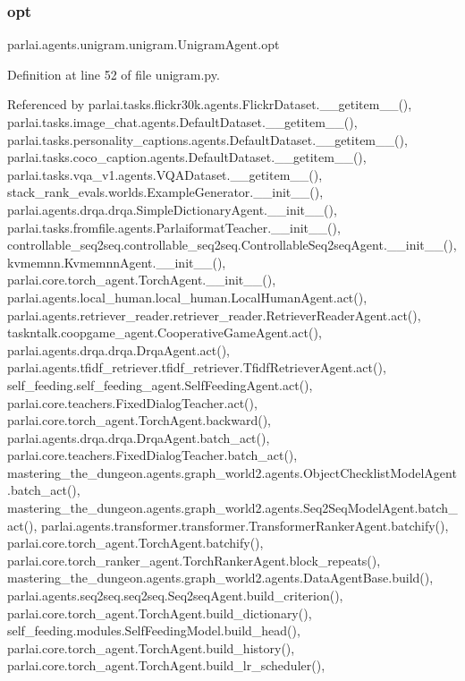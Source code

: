 \subsubsection{\texorpdfstring{opt}{opt}}
{\footnotesize\ttfamily parlai.\+agents.\+unigram.\+unigram.\+Unigram\+Agent.\+opt}



Definition at line 52 of file unigram.\+py.



Referenced by parlai.\+tasks.\+flickr30k.\+agents.\+Flickr\+Dataset.\+\_\+\+\_\+getitem\+\_\+\+\_\+(), parlai.\+tasks.\+image\+\_\+chat.\+agents.\+Default\+Dataset.\+\_\+\+\_\+getitem\+\_\+\+\_\+(), parlai.\+tasks.\+personality\+\_\+captions.\+agents.\+Default\+Dataset.\+\_\+\+\_\+getitem\+\_\+\+\_\+(), parlai.\+tasks.\+coco\+\_\+caption.\+agents.\+Default\+Dataset.\+\_\+\+\_\+getitem\+\_\+\+\_\+(), parlai.\+tasks.\+vqa\+\_\+v1.\+agents.\+V\+Q\+A\+Dataset.\+\_\+\+\_\+getitem\+\_\+\+\_\+(), stack\+\_\+rank\+\_\+evals.\+worlds.\+Example\+Generator.\+\_\+\+\_\+init\+\_\+\+\_\+(), parlai.\+agents.\+drqa.\+drqa.\+Simple\+Dictionary\+Agent.\+\_\+\+\_\+init\+\_\+\+\_\+(), parlai.\+tasks.\+fromfile.\+agents.\+Parlaiformat\+Teacher.\+\_\+\+\_\+init\+\_\+\+\_\+(), controllable\+\_\+seq2seq.\+controllable\+\_\+seq2seq.\+Controllable\+Seq2seq\+Agent.\+\_\+\+\_\+init\+\_\+\+\_\+(), kvmemnn.\+Kvmemnn\+Agent.\+\_\+\+\_\+init\+\_\+\+\_\+(), parlai.\+core.\+torch\+\_\+agent.\+Torch\+Agent.\+\_\+\+\_\+init\+\_\+\+\_\+(), parlai.\+agents.\+local\+\_\+human.\+local\+\_\+human.\+Local\+Human\+Agent.\+act(), parlai.\+agents.\+retriever\+\_\+reader.\+retriever\+\_\+reader.\+Retriever\+Reader\+Agent.\+act(), taskntalk.\+coopgame\+\_\+agent.\+Cooperative\+Game\+Agent.\+act(), parlai.\+agents.\+drqa.\+drqa.\+Drqa\+Agent.\+act(), parlai.\+agents.\+tfidf\+\_\+retriever.\+tfidf\+\_\+retriever.\+Tfidf\+Retriever\+Agent.\+act(), self\+\_\+feeding.\+self\+\_\+feeding\+\_\+agent.\+Self\+Feeding\+Agent.\+act(), parlai.\+core.\+teachers.\+Fixed\+Dialog\+Teacher.\+act(), parlai.\+core.\+torch\+\_\+agent.\+Torch\+Agent.\+backward(), parlai.\+agents.\+drqa.\+drqa.\+Drqa\+Agent.\+batch\+\_\+act(), parlai.\+core.\+teachers.\+Fixed\+Dialog\+Teacher.\+batch\+\_\+act(), mastering\+\_\+the\+\_\+dungeon.\+agents.\+graph\+\_\+world2.\+agents.\+Object\+Checklist\+Model\+Agent.\+batch\+\_\+act(), mastering\+\_\+the\+\_\+dungeon.\+agents.\+graph\+\_\+world2.\+agents.\+Seq2\+Seq\+Model\+Agent.\+batch\+\_\+act(), parlai.\+agents.\+transformer.\+transformer.\+Transformer\+Ranker\+Agent.\+batchify(), parlai.\+core.\+torch\+\_\+agent.\+Torch\+Agent.\+batchify(), parlai.\+core.\+torch\+\_\+ranker\+\_\+agent.\+Torch\+Ranker\+Agent.\+block\+\_\+repeats(), mastering\+\_\+the\+\_\+dungeon.\+agents.\+graph\+\_\+world2.\+agents.\+Data\+Agent\+Base.\+build(), parlai.\+agents.\+seq2seq.\+seq2seq.\+Seq2seq\+Agent.\+build\+\_\+criterion(), parlai.\+core.\+torch\+\_\+agent.\+Torch\+Agent.\+build\+\_\+dictionary(), self\+\_\+feeding.\+modules.\+Self\+Feeding\+Model.\+build\+\_\+head(), parlai.\+core.\+torch\+\_\+agent.\+Torch\+Agent.\+build\+\_\+history(), parlai.\+core.\+torch\+\_\+agent.\+Torch\+Agent.\+build\+\_\+lr\+\_\+scheduler(), 